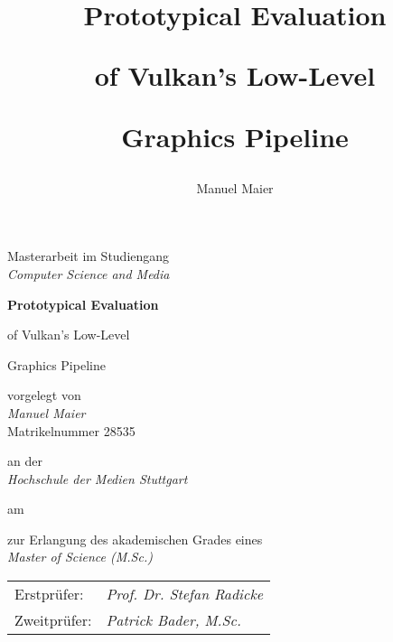 \documentclass{scrreprt}
\begin{document}

  {
    \begin{titlepage}
      \begin{centering}

        \large

        Masterarbeit im Studiengang \\ \textit{\Large Computer Science and Media}

        \vspace{\fill}

        {\fontsize{2.4em}{0}\selectfont\bfseries
          Prototypical Evaluation \par of Vulkan's Low-Level \par Graphics Pipeline
        }

        \vspace{\fill}

        vorgelegt von \\ \textit{\Large Manuel Maier} \\ Matrikelnummer 28535

        an der \\ \textit{\Large Hochschule der Medien Stuttgart}

        am \\ \textit{\Large \DTMtoday}

        zur Erlangung des akademischen Grades eines \\ \textit{\Large Master of Science (M.Sc.)}

      \end{centering}

      \vspace{\fill}

      \begin{tabu}{ll}
        Erstprüfer:  & \textit{Prof. Dr. Stefan Radicke} \\
        Zweitprüfer: & \textit{Patrick Bader, M.Sc.}
      \end{tabu}

    \end{titlepage}
  }
  {
    \titlehead{}
    \subject{Master's Thesis \\ Computer Science and Media \\ Hochschule der Medien Stuttgart}
    \title{Prototypical Evaluation \par of Vulkan's Low-Level \par Graphics Pipeline}
    \author{Manuel Maier}
    \date{\DTMToday}
    \publishers
    {
      Supervisors \\
      \textbf{Prof. Dr. Stefan Radicke}\\
      \textbf{Patrick Bader, M.Sc.}
    }
    \maketitle
  }
\end{document}
